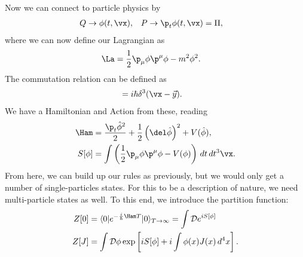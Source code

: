 \documentclass[a4paper, 11pt, normalem]{report}
\begin{document}
Now we can connect to particle physics by
\begin{align}
    Q &\to \phi(t,\vx), & P &\to \p_t\phi(t,\vx) = \Pi,
\end{align}
where we can now define our Lagrangian as
\begin{align}
    \La &= \frac12 \p_\mu\phi\p^\mu\phi - m^2\phi^2.
\end{align}
The commutation relation can be defined as
\begin{align}
    [\hat{\phi}(\vx),\hat{\Pi}(\vec{y})] &= i\hbar\delta^3(\vx-\vec{y}).
\end{align}
We have a Hamiltonian and Action from these, reading
\begin{align}
    \Ham &= \frac{\p_t\hat{\phi}^2}{2} + \frac12\left(\del\hat{\phi}\right)^2+V(\hat{\phi}), \\
    S[\phi] &= \int \left(\frac12\p_\mu\phi\p^\mu\phi - V(\phi)\right)\,dt\,dt^3\vx.
\end{align}
From here, we can build up our rules as previously, but we would only get a number of single-particles states.
For this to be a description of nature, we need multi-particle states as well.
To this end, we introduce the partition function:
\begin{align}
    Z[0] &= \langle0|e^{-\frac{i}{\hbar}\Ham T}|0\rangle_{T\to\infty} = \int\mathcal{D}e^{iS[\phi]}\\
    Z[J] &= \int \mathcal{D}\phi\exp\left[iS[\phi]+i\int\phi(x)J(x)\,d^4x\right].
\end{align}
\end{document}
